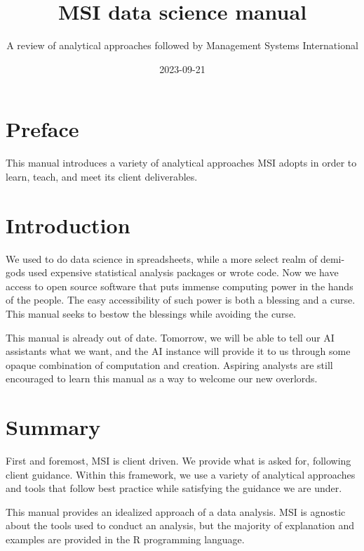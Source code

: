 \documentclass[
  letterpaper,
  DIV=11,
  numbers=noendperiod]{scrreprt}
\title{MSI data science manual}
\subtitle{A review of analytical approaches followed by Management
Systems International}
\author{}
\date{2023-09-21}
\renewcommand*\contentsname{Table of contents}
\newcommand\contentsname{Table of contents}
\begin{document}
\maketitle

\renewcommand*\contentsname{Table of contents}
{
\hypersetup{linkcolor=}
\setcounter{tocdepth}{2}
\tableofcontents
}

\chapter*{Preface}\label{preface}


This manual introduces a variety of analytical approaches MSI adopts in
order to learn, teach, and meet its client deliverables.


\chapter{Introduction}\label{introduction}

We used to do data science in spreadsheets, while a more select realm of
demi-gods used expensive statistical analysis packages or wrote code.
Now we have access to open source software that puts immense computing
power in the hands of the people. The easy accessibility of such power
is both a blessing and a curse. This manual seeks to bestow the
blessings while avoiding the curse.

This manual is already out of date. Tomorrow, we will be able to tell
our AI assistants what we want, and the AI instance will provide it to
us through some opaque combination of computation and creation. Aspiring
analysts are still encouraged to learn this manual as a way to welcome
our new overlords.


\chapter{Summary}\label{summary}

First and foremost, MSI is client driven. We provide what is asked for,
following client guidance. Within this framework, we use a variety of
analytical approaches and tools that follow best practice while
satisfying the guidance we are under.

This manual provides an idealized approach of a data analysis. MSI is
agnostic about the tools used to conduct an analysis, but the majority
of explanation and examples are provided in the R programming language.
\end{document}
